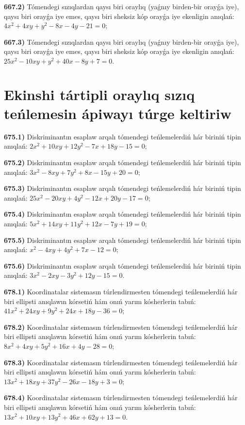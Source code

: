 \textbf{667.2)} Tómendegi sızıqlardan qaysı biri oraylıq (yaǵnıy birden-bir orayǵa iye), qaysı biri orayǵa iye emes, qaysı biri sheksiz kóp orayǵa iye ekenligin anıqlań:  $4 x^2+4 x y+y^2-8 x-4 y-21=0$;

\textbf{667.3)} Tómendegi sızıqlardan qaysı biri oraylıq (yaǵnıy birden-bir orayǵa iye), qaysı biri orayǵa iye emes, qaysı biri sheksiz kóp orayǵa iye ekenligin anıqlań: $25 x^2-10 x y+y^2+40 x-8 y+7=0$.



\section{Ekinshi tártipli oraylıq sızıq teńlemesin ápiwayı túrge keltiriw}



\textbf{675.1)} Diskriminantın esaplaw arqalı tómendegi teńlemelerdiń hár biriniń tipin anıqlań: $2 x^2+10 x y+12 y^2-7 x+18 y-15=0$;

\textbf{675.2)} Diskriminantın esaplaw arqalı tómendegi teńlemelerdiń hár biriniń tipin anıqlań: $3 x^2-8 x y+7 y^2+8 x-15 y+20=0$;

\textbf{675.3)} Diskriminantın esaplaw arqalı tómendegi teńlemelerdiń hár biriniń tipin anıqlań: $25 x^2-20 x y+4 y^2-12 x+20 y-17=0$;

\textbf{675.4)} Diskriminantın esaplaw arqalı tómendegi teńlemelerdiń hár biriniń tipin anıqlań: $5 x^2+14 x y+11 y^2+12 x-7 y+19=0$;

\textbf{675.5)} Diskriminantın esaplaw arqalı tómendegi teńlemelerdiń hár biriniń tipin anıqlań: $x^2-4 x y+4 y^2+7 x-12=0$;

\textbf{675.6)} Diskriminantın esaplaw arqalı tómendegi teńlemelerdiń hár biriniń tipin anıqlań: $3 x^2-2 x y-3 y^2+12 y-15=0$.

\textbf{678.1)} Koordinatalar sistemasın túrlendirmesten tómendegi teńlemelerdiń hár biri ellipsti anıqlawın kórsetiń hám onıń yarım kósherlerin tabıń: $41 x^2+24 x y+9 y^2+24 x+18 y-36=0$;

\textbf{678.2)} Koordinatalar sistemasın túrlendirmesten tómendegi teńlemelerdiń hár biri ellipsti anıqlawın kórsetiń hám onıń yarım kósherlerin tabıń: $8 x^2+4 x y+5 y^2+16 x+4 y-28=0$;

\textbf{678.3)} Koordinatalar sistemasın túrlendirmesten tómendegi teńlemelerdiń hár biri ellipsti anıqlawın kórsetiń hám onıń yarım kósherlerin tabıń: $13 x^2+18 x y+37 y^2-26 x-18 y+3=0$;

\textbf{678.4)} Koordinatalar sistemasın túrlendirmesten tómendegi teńlemelerdiń hár biri ellipsti anıqlawın kórsetiń hám onıń yarım kósherlerin tabıń: $13 x^2+10 x y+13 y^2+46 x+62 y+13=0$.

